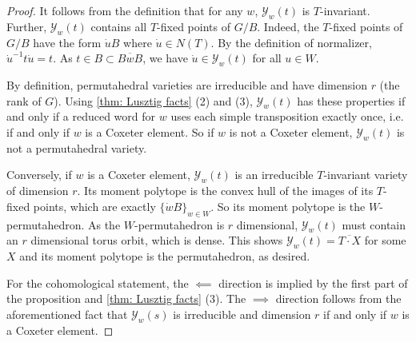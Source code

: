 \documentclass[10pt,a4paper]{amsart}
\newcommand{\MSB}[1]{\textcolor{violet}{[MSB: #1]}}
\newcommand{\AK}[1]{\textcolor{darkgreen}{[AK: #1]}}
\DeclareMathOperator{\Perm}{Perm}
\newcommand\calY{{\mathcal Y}}
\newcommand\junk[1]{}
\begin{document}
\begin{proof}
	It follows from the definition that for any $w$, $\calY_w(t)$ is
	$T$-invariant. Further, $\calY_w(t)$ contains all $T$-fixed points
	of $G/B$. Indeed, the $T$-fixed points of $G/B$ have the form
	$\dot u B$ where $\dot u \in N(T)$. By the definition of normalizer,
	$\dot u^{-1} t \dot u =t $. As $t \in B \subset \overline{B w B}$,
	we have $\dot u \in \calY_w(t)$ for all $u \in W$.
	
	By definition, permutahedral varieties are irreducible and have
	dimension $r$ (the rank of $G$). Using \cref{thm: Lusztig facts} (2) and (3),
	$\calY_w(t)$ has these properties if and only if a reduced word for
	$w$ uses each simple transposition exactly once, i.e. if and only if
	$w$ is a Coxeter element. So if $w$ is not a Coxeter element,
	$\calY_w(t)$ is not a permutahedral variety.
	
	Conversely, if $w$ is a Coxeter element, $\calY_w(t)$ is an irreducible $T$-invariant variety of dimension $r$. Its moment polytope is the convex hull of the images of its $T$-fixed points, which are exactly $\{\dot w B\}_{w \in W}$. So its moment polytope is the $W$-permutahedron. As the $W$-permutahedron is $r$ dimensional, $\calY_w(t)$ must contain an $r$ dimensional torus orbit, which is dense. This shows $\calY_w(t) = \overline{T \cdot X}$ for some $X$ and its moment polytope is the permutahedron, as desired.
	
	For the cohomological statement, the $\impliedby$ direction is implied by the first part of the proposition and \cref{thm: Lusztig facts} (3). The $\implies$ direction follows from the aforementioned fact that $\calY_w(s)$ is irreducible and dimension $r$ if and only if $w$ is a Coxeter element.
\end{proof}

\junk{\MSB{Is it true that $[\calY_w(s)] = [\Perm]$ is the permutahedral
		class if and only if $w=c$? For all other $w$, either
		$\dim \calY_w(s)> n-1$ or $\calY_w(s)$ is reducible. I think the
		former clearly rules out that $[\calY_w(s)] = [\Perm]$, but not as
		clear about the latter.}
	\AK{I'm not seeing a trivial way to rule it out, what with not having a
		particularly computable formula for the class as a combination
		of Schubert classes. Trivially, the two are different in {\em $T$-equivariant}
		cohomology. I think one could maybe show that $[Perm]$ times a
		certain product of $c_1$s = $[\calY_w(t)]$ times a different product
		of $c_1$s. Anyway, the basic issue is that for $w$ not using all
		the generators, $\calY_w(t)$ is disconnected, i.e. not a ``variety'',
		so shouldn't we just say those are dumb and disallow them?}
	\MSB{Yeah, seems good.}}
\end{document}
